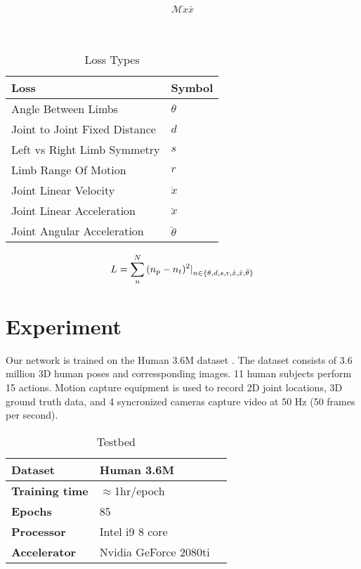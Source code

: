 \documentclass[runningheads]{llncs}
\begin{document}
$$
\mathcal{M} \ddot{x} \bar{x}
$$\\\\
\fi



\begin{table}
\centering
\caption{\label{tab:table-name}Loss Types}
\begin{tabular}{|l|l|}
\hline
\textbf{Loss} &
\textbf{Symbol} \\

\hline
        Angle Between Limbs &
        $\theta$
        \\
\hline
        Joint to Joint Fixed Distance &
        $d$
        \\
\hline
        Left vs Right Limb Symmetry&
        $s$
        \\
\hline
        Limb Range Of Motion &
        $r$
        \\
\hline
        Joint Linear Velocity &
        $\dot x$
        \\
\hline
        Joint Linear Acceleration &
        $\ddot x$
        \\
\hline
        Joint Angular Acceleration &
        $\ddot \theta$
        \\
\hline
\end{tabular}



\end{table}

\begin{equation} \label{eq:mse}
L = \sum_{n}^{N}\\
(n_p - n_t)^2|
_{n\in \{\theta, d, s, r, \dot x , \ddot x, \ddot \theta\}}
  \centering
\end{equation}

\section{Experiment}

Our network is trained on the Human 3.6M dataset \cite{ionescu2014iterated}. The dataset consists of 3.6 million 3D human poses and corressponding images. 11 human subjects perform 15 actions. Motion capture equipment is used to record 2D joint locations, 3D ground truth data, and 4 syncronized cameras capture video at 50 Hz (50 frames per second).

\begin{table}
\caption{Testbed}
\begin{center}
\small
\begin{tabular}{|l|l|l|}\hline
\textbf{Dataset} & Human 3.6M \\ \hline
\textbf{Training time} & $\approx$1hr/epoch\\ \hline
\textbf{Epochs} & 85 \\ \hline
\textbf{Processor} & Intel i9 8 core \\ \hline
\textbf{Accelerator} & Nvidia GeForce 2080ti \\ \hline
\end{tabular}
\end{center}
\label{table:testbed}
\end{table}
\end{document}
